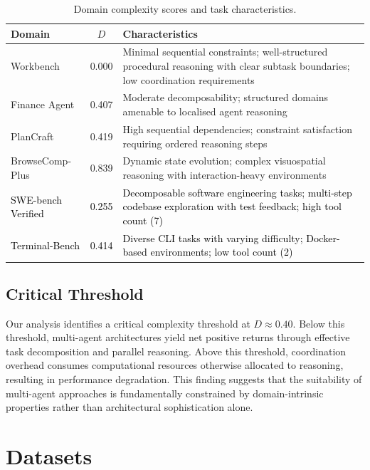 \begin{table}[h]
\centering
\caption{Domain complexity scores and task characteristics.}
\label{tab:domain_complexity}
\begin{tabular}{lcp{11.3cm}}
\toprule
\textbf{Domain} & \textbf{$D$} & \textbf{Characteristics} \\
\midrule
Workbench & 0.000 & Minimal sequential constraints; well-structured procedural reasoning with clear subtask boundaries; low coordination requirements \\
Finance Agent & 0.407 & Moderate decomposability; structured domains amenable to localised agent reasoning \\
PlanCraft & 0.419 & High sequential dependencies; constraint satisfaction requiring ordered reasoning steps \\
BrowseComp-Plus & 0.839 & Dynamic state evolution; complex visuospatial reasoning with interaction-heavy environments \\
\textcolor{black}{SWE-bench Verified} & \textcolor{black}{0.255} & \textcolor{black}{Decomposable software engineering tasks; multi-step codebase exploration with test feedback; high tool count (7)} \\
\textcolor{black}{Terminal-Bench} & \textcolor{black}{0.414} & \textcolor{black}{Diverse CLI tasks with varying difficulty; Docker-based environments; low tool count (2)} \\
\bottomrule
\end{tabular}
\end{table}

\subsection{Critical Threshold}

Our analysis identifies a critical complexity threshold at $D \approx 0.40$. Below this threshold, multi-agent architectures yield net positive returns through effective task decomposition and parallel reasoning. Above this threshold, coordination overhead consumes computational resources otherwise allocated to reasoning, resulting in performance degradation. This finding suggests that the suitability of multi-agent approaches is fundamentally constrained by domain-intrinsic properties rather than architectural sophistication alone.


\section{Datasets}

